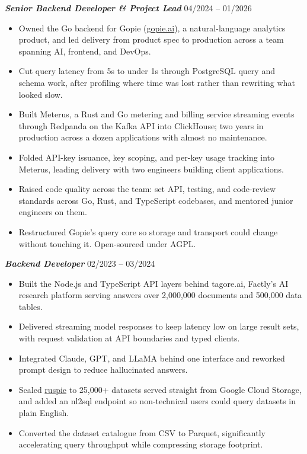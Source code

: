 \documentclass[10pt,a4paper]{article}
\newcommand{\subentryheader}[2]{
  \noindent\textbf{\color{primary}\textit{\small #1}} \hfill {\small\color{meta}#2}\vspace{1.5pt}
}
\begin{document}
\subentryheader{Senior Backend Developer \& Project Lead}{04/2024 -- 01/2026}
\begin{itemize}
  \item Owned the Go backend for Gopie (\href{https://gopie.ai}{gopie.ai}), a natural-language analytics product, and led delivery from product spec to production across a team spanning AI, frontend, and DevOps.
  \item Cut query latency from 5s to under 1s through PostgreSQL query and schema work, after profiling where time was lost rather than rewriting what looked slow.
  \item Built Meterus, a Rust and Go metering and billing service streaming events through Redpanda on the Kafka API into ClickHouse; two years in production across a dozen applications with almost no maintenance.
  \item Folded API-key issuance, key scoping, and per-key usage tracking into Meterus, leading delivery with two engineers building client applications.
  \item Raised code quality across the team: set API, testing, and code-review standards across Go, Rust, and TypeScript codebases, and mentored junior engineers on them.
  \item Restructured Gopie's query core so storage and transport could change without touching it. Open-sourced under AGPL.
\end{itemize}

\subentryheader{Backend Developer}{02/2023 -- 03/2024}
\begin{itemize}
  \item Built the Node.js and TypeScript API layers behind tagore.ai, Factly's AI research platform serving answers over 2,000,000 documents and 500,000 data tables.
  \item Delivered streaming model responses to keep latency low on large result sets, with request validation at API boundaries and typed clients.
  \item Integrated Claude, GPT, and LLaMA behind one interface and reworked prompt design to reduce hallucinated answers.
  \item Scaled \href{https://github.com/factly/ruspie}{ruspie} to 25,000+ datasets served straight from Google Cloud Storage, and added an nl2sql endpoint so non-technical users could query datasets in plain English.
  \item Converted the dataset catalogue from CSV to Parquet, significantly accelerating query throughput while compressing storage footprint.
\end{itemize}
\end{document}
